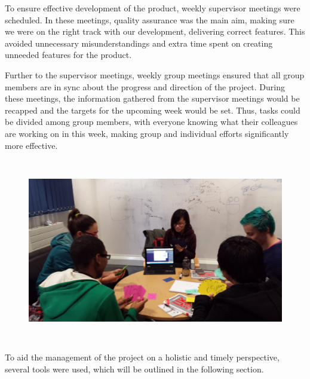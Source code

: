 \documentclass[11pt, a4paper]{article}
\begin{document}
To ensure effective development of the product, weekly supervisor meetings were scheduled.
In these meetings, quality assurance was the main aim, making sure we were on the right track with our development, delivering correct features. 
This avoided unnecessary misunderstandings and extra time spent on creating unneeded features for the product. 

Further to the supervisor meetings, weekly group meetings ensured that all group members are in sync about the progress and direction of the project. 
During these meetings, the information gathered from the supervisor meetings would be recapped and the targets for the upcoming week would be set. 
Thus, tasks could be divided among group members, with everyone knowing what their colleagues are working on in this week, making group and individual efforts significantly more effective.
\begin{figure}[h!]
\centering
\includegraphics[height=80mm,width=130mm]{estimation.jpg}
\end{figure}

To aid the management of the project on a holistic and timely perspective, several tools were used, which will be outlined in the following section.
\end{document}
